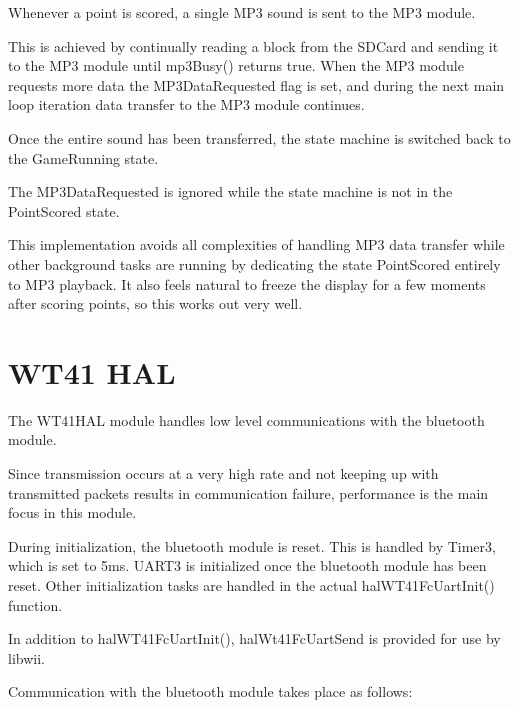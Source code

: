 \documentclass[12pt,a4paper,titlepage,oneside]{article}
\begin{document}
Whenever a point is scored, a single MP3 sound is sent to the MP3 module.

This is achieved by continually reading a block from the SDCard and sending
it to the MP3 module until mp3Busy() returns true. When the MP3 module
requests more data the MP3DataRequested flag is set, and during the next main
loop iteration data transfer to the MP3 module continues.

Once the entire sound has been transferred, the state machine is switched back
to the GameRunning state.

The MP3DataRequested is ignored while the state machine is not in the
PointScored state.

This implementation avoids all complexities of handling MP3 data transfer
while other background tasks are running by dedicating the state PointScored
entirely to MP3 playback. It also feels natural to freeze the display for
a few moments after scoring points, so this works out very well.

\section{WT41 HAL}

The WT41HAL module handles low level communications with the bluetooth module.

Since transmission occurs at a very high rate and not keeping up with
transmitted packets results in communication failure, performance is the
main focus in this module.

During initialization, the bluetooth module is reset. This is handled by
Timer3, which is set to 5ms. UART3 is initialized once the bluetooth module
has been reset. Other initialization tasks are handled in the actual 
halWT41FcUartInit() function.

In addition to halWT41FcUartInit(), halWt41FcUartSend is provided for use by
libwii. 

Communication with the bluetooth module takes place as follows:
\end{document}
